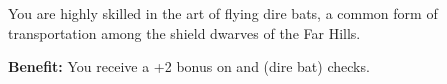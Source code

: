 
You are highly skilled in the art of flying dire bats, a common form of transportation among the shield dwarves of the Far Hills.

\textbf{Benefit:} You receive a +2 bonus on  and  (dire bat) checks.